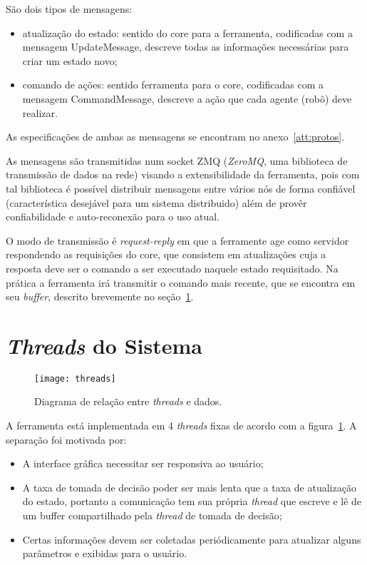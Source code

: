 São dois tipos de mensagens:

\begin{itemize}
  \item atualização do estado: sentido do core para a ferramenta, codificadas
    com a mensagem UpdateMessage, descreve todas as informações necessárias para
    criar um estado novo;
  \item comando de ações: sentido ferramenta para o core, codificadas com a
    mensagem CommandMessage, descreve a ação que cada agente (robô) deve
    realizar.
\end{itemize}

As especificações de ambas as mensagens se encontram no anexo~\ref{att:protos}.

As mensagens são transmitidas num socket ZMQ (\textit{ZeroMQ}, uma biblioteca de
transmissão de dados na rede) visando a extensibilidade da ferramenta, pois com
tal biblioteca é possível distribuir mensagens entre vários nós de forma
confiável (característica desejável para um sistema distribuido) além de provêr
confiabilidade e auto-reconexão para o uso atual.

O modo de transmissão é \textit{request-reply} em que a ferramente age como
servidor respondendo as requisições do core, que consistem em atualizações cuja
a resposta deve ser o comando a ser executado naquele estado requisitado.  Na
prática a ferramenta irá transmitir o comando mais recente, que se encontra em
seu \textit{buffer}, descrito brevemente no seção~\ref{sec:threads}.

\section{\textit{Threads} do Sistema}\label{sec:threads}

\begin{figure}[H]
  \centering
  \texttt{[image: threads]}
  \caption{Diagrama de relação entre \textit{threads} e
  dados.}\label{fig:arch-threads}
\end{figure}

A ferramenta está implementada em 4 \textit{threads} fixas de acordo com a
figura~\ref{fig:arch-threads}.  A separação foi motivada por:

\begin{itemize}
  \item A interface gráfica necessitar ser responsiva ao usuário;
  \item A taxa de tomada de decisão poder ser mais lenta que a taxa de
    atualização do estado, portanto a comunicação tem sua própria
    \textit{thread} que escreve e lê de um buffer compartilhado pela
    \textit{thread} de tomada de decisão;
  \item Certas informações devem ser coletadas periódicamente para atualizar
    alguns parâmetros e exibidas para o usuário.
\end{itemize}

